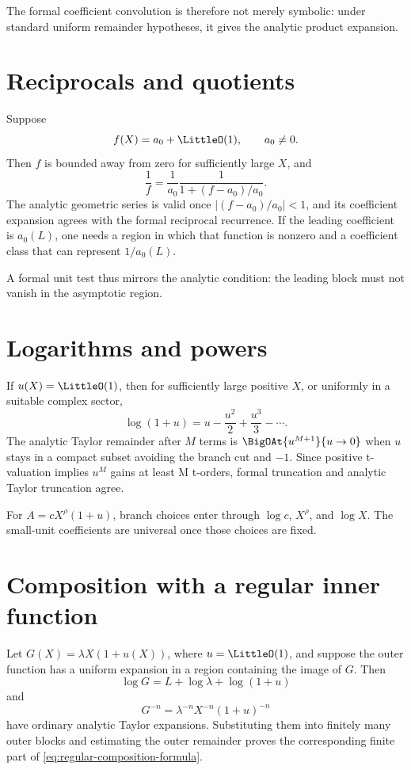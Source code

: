 \documentclass[11pt,openany]{book}
\theoremstyle{definition}
\theoremstyle{plain}
\theoremstyle{remark}
\begin{document}
The formal coefficient convolution is therefore not merely symbolic: under
standard uniform remainder hypotheses, it gives the analytic product
expansion.

\section{Reciprocals and quotients}
Suppose
\[
 f(X)=a_0+\LittleO(1),
 \qquad a_0\ne0.
\]
Then \(f\) is bounded away from zero for sufficiently large \(X\), and
\[
 \frac1f=\frac1{a_0}\frac1{1+(f-a_0)/a_0}.
\]
The analytic geometric series is valid once
\(|(f-a_0)/a_0|<1\), and its coefficient expansion agrees with the formal
reciprocal recurrence.  If the leading coefficient is \(a_0(L)\), one needs a
region in which that function is nonzero and a coefficient class that can
represent \(1/a_0(L)\).

A formal unit test thus mirrors the analytic condition: the leading block must
not vanish in the asymptotic region.

\section{Logarithms and powers}
If \(u(X)=\LittleO(1)\), then for sufficiently large positive \(X\), or uniformly in
a suitable complex sector,
\[
 \log(1+u)=u-\frac{u^2}{2}+\frac{u^3}{3}-\cdots.
\]
The analytic Taylor remainder after \(M\) terms is
\(\BigOAt{u^{M+1}}{u\to0}\) when \(u\) stays in a compact subset avoiding the branch cut and
\(-1\).  Since positive t-valuation implies \(u^M\) gains at least M t-orders,
formal truncation and analytic Taylor truncation agree.

For \(A=cX^\rho(1+u)\), branch choices enter through \(\log c\),
\(X^\rho\), and \(\log X\).  The small-unit coefficients are universal once
those choices are fixed.

\section{Composition with a regular inner function}
Let \(G(X)=\lambda X(1+u(X))\), where \(u=\LittleO(1)\), and suppose the outer
function has a uniform expansion in a region containing the image of \(G\).
Then
\[
 \log G=L+\log\lambda+\log(1+u)
\]
and
\[
 G^{-n}=\lambda^{-n}X^{-n}(1+u)^{-n}
\]
have ordinary analytic Taylor expansions.  Substituting them into finitely many
outer blocks and estimating the outer remainder proves the corresponding
finite part of \cref{eq:regular-composition-formula}.
\end{document}
